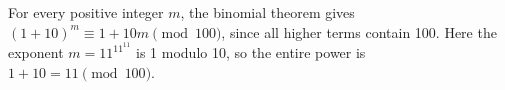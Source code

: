 For every positive integer $m$, the binomial theorem gives $(1+10)^m\equiv1+10m\pmod{100}$, since all higher terms contain 100. Here the exponent $m=11^{11^{11}}$ is 1 modulo 10, so the entire power is $1+10=\boxed{11}\pmod{100}$.
